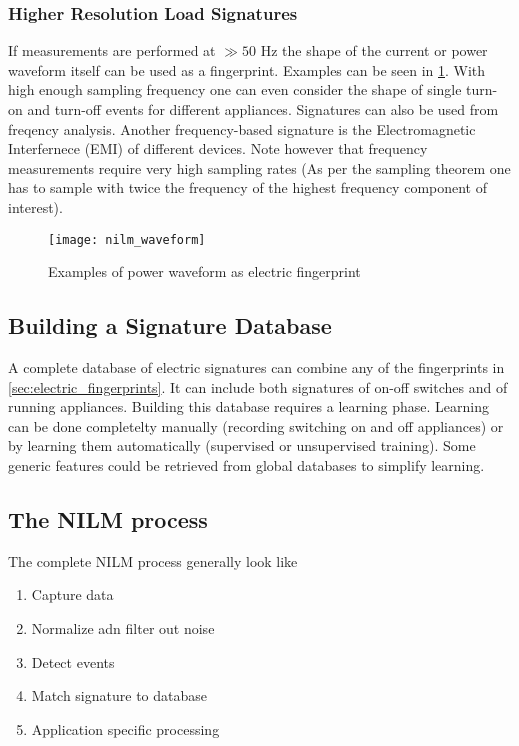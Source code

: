 \subsubsection{Higher Resolution Load Signatures}
If measurements are performed at $\gg 50$ Hz the shape of the current or power waveform itself can be used as a fingerprint.
Examples can be seen in \ref{fig:nilm_waveform}.
With high enough sampling frequency one can even consider the shape of single turn-on and turn-off events for different appliances.
Signatures can also be used from freqency analysis.
Another frequency-based signature is the Electromagnetic Interfernece (EMI) of different devices.
Note however that frequency measurements require very high sampling rates (As per the sampling theorem one has to sample with twice the frequency of the highest frequency component of interest).

\begin{figure}
    \centering
    \texttt{[image: nilm\_waveform]}
    \caption{Examples of power waveform as electric fingerprint}
    \label{fig:nilm_waveform}
\end{figure}

\subsection{Building a Signature Database}
A complete database of electric signatures can combine any of the fingerprints in \ref{sec:electric_fingerprints}.
It can include both signatures of on-off switches and of running appliances.
Building this database requires a learning phase.
Learning can be done completelty manually (recording switching on and off appliances) or by learning them automatically (supervised or unsupervised training).
Some generic features could be retrieved from global databases to simplify learning.\\

\subsection{The NILM process}
The complete NILM process generally look like

\begin{enumerate}
    \item Capture data
    \item Normalize adn filter out noise
    \item Detect events
    \item Match signature to database
    \item Application specific processing
\end{enumerate}


